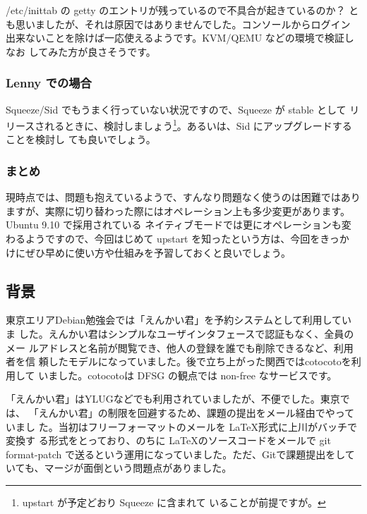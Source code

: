 \documentclass[mingoth,a4paper]{jsarticle}
\begin{document}
/etc/inittab の getty のエントリが残っているので不具合が起きているのか？
とも思いましたが、それは原因ではありませんでした。コンソールからログイン
出来ないことを除けば一応使えるようです。KVM/QEMU などの環境で検証しなお
してみた方が良さそうです。

\subsubsection{Lenny での場合}

Squeeze/Sid でもうまく行っていない状況ですので、Squeeze が stable として
リリースされるときに、検討しましょう\footnote{upstart が予定どおり Squeeze に含まれて
いることが前提ですが。}。あるいは、Sid にアップグレードすることを検討し
ても良いでしょう。

\subsubsection{まとめ}

現時点では、問題も抱えているようで、すんなり問題なく使うのは困難ではあり
ますが、実際に切り替わった際にはオペレーション上も多少変更があります。
Ubuntu 9.10 で採用されている ネイティブモードでは更にオペレーションも変
わるようですので、今回はじめて upstart を知ったという方は、今回をきっか
けにぜひ早めに使い方や仕組みを予習しておくと良いでしょう。


\subsection{背景}

東京エリアDebian勉強会では「えんかい君」を予約システムとして利用していま
した。えんかい君はシンプルなユーザインタフェースで認証もなく、全員のメー
ルアドレスと名前が閲覧でき、他人の登録を誰でも削除できるなど、利用者を信
頼したモデルになっていました。後で立ち上がった関西ではcotocotoを利用して
いました。cotocotoは DFSG の観点では non-free なサービスです。

「えんかい君」はYLUGなどでも利用されていましたが、不便でした。東京では、
「えんかい君」の制限を回避するため、課題の提出をメール経由でやっていまし
た。当初はフリーフォーマットのメールを \LaTeX 形式に上川がバッチで変換す
る形式をとっており、のちに \LaTeX のソースコードをメールで git
format-patch で送るという運用になっていました。ただ、Gitで課題提出をして
いても、マージが面倒という問題点がありました。
\end{document}
